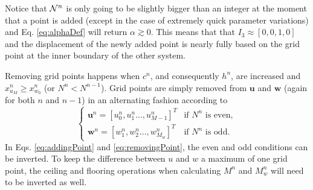 Notice that $\mathcal{N}^n$ is only going to be slightly bigger than an integer at the moment that a point is added (except in the case of extremely quick parameter variations) and Eq. \eqref{eq:alphaDef} will return $\alpha \gtrsim 0$.
This means that that $I_3 \approx [0, 0, 1, 0]$ and the displacement of the newly added point is nearly fully based on the grid point at the inner boundary of the other system. %

Removing grid points happens when $c^n$, and consequently $h^n$, are increased and $x_{u_M}^n \geq x_{w_0}^n$ (or $ N^n <  N^{n-1}$). %
Grid points are simply removed from $\mathbf{u}$ and $\mathbf{w}$ (again for both $n$ and $n-1$) in an alternating fashion according to
\begin{equation}\label{eq:removingPoint}
\begin{cases}
    \mathbf{u}^n = [u_0^n, u_1^n ..., u_{M-1}^n]^T & \text{if $N^n$ is even}, \\
     \mathbf{w}^n = [w_1^n, w_2^n ..., w_{M_w}^n]^T & \text{if $N^n$ is odd}.
    \end{cases}
\end{equation}
In Eqs. \eqref{eq:addingPoint} and \eqref{eq:removingPoint}, the even and odd conditions can be inverted. To keep the difference between $u$ and $w$ a maximum of one grid point, the ceiling and flooring operations when calculating $M^n$ and $M_w^n$ will need to be inverted as well.

